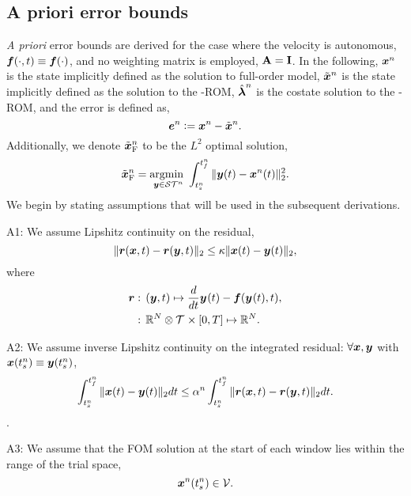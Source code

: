\subsection{A priori error bounds}
\textit{A priori} error bounds are derived for the case where the velocity is autonomous, $\boldsymbol f(\cdot,t) \equiv \boldsymbol f(\cdot)$, and no weighting matrix is employed, $\mathbf{A} = \mathbf{I}$. 
In the following,  ${\boldsymbol x}^{n}$ is the state implicitly defined as the solution to full-order model, $\tilde{\boldsymbol x}^{n}$ is the state implicitly defined as the solution to the \methodAcronym-ROM, $\hat{\boldsymbol \lambda}^{n}$ is the costate solution to the \methodAcronym-ROM, and the error is defined as,
$$\boldsymbol e^{n} \vcentcolon= {\boldsymbol x}^{n} - \tilde{\boldsymbol x}^{n}.$$
Additionally, we denote $\tilde{\boldsymbol x}_{\text{F}}^{n}$ to be the $L^2$ optimal solution,
$$\tilde{\boldsymbol x}_{\text{F}}^{n} = \underset{\boldsymbol y \in \mathcal{ ST }^n}{\text{argmin } } \int_{t_s^{n}}^{t_f^{n}} \|  \boldsymbol y(t) - {\boldsymbol x}^{n}(t)  \|_2^2.$$ 
We begin by stating assumptions that will be used in the subsequent derivations.

A1: We assume  Lipshitz continuity on the residual,
$$ \| \boldsymbol r(\boldsymbol x,t) - \boldsymbol r(\boldsymbol y,t)  \|_2 \le \kappa \| \boldsymbol x(t) - \boldsymbol y(t) \|_2,$$
where  
\begin{align*}
\boldsymbol r &: \, (\boldsymbol y,t) \mapsto \frac{d}{dt}\boldsymbol y^{}(t) - \boldsymbol f(\boldsymbol y^{}(t),t) ,\\
&: \, \mathbb{R}^{N} \otimes \mathcal{T}^{} \times [0,T] \mapsto \mathbb{R}^{N}.
\end{align*}

A2: We assume inverse Lipshitz continuity on the integrated residual: $\forall \boldsymbol x,\boldsymbol y$ with $\boldsymbol x(t_s^{n} ) \equiv \boldsymbol y(t_s^{n})$,
$$  \int_{t_s^{n}}^{t_f^{n}} \| \boldsymbol x(t) - \boldsymbol y(t) \|_2 dt \le  \alpha^{n} \int_{t_s^{n}}^{t_f^{n}} \| \boldsymbol r(\boldsymbol x,t) - \boldsymbol r(\boldsymbol y,t)  \|_2 dt.$$
.

A3: We assume that the FOM solution at the start of each window lies within the range of the trial space,
$$ {\boldsymbol x}^{n}(t_s^{n}) \in \mathcal{V }.$$ 
%

